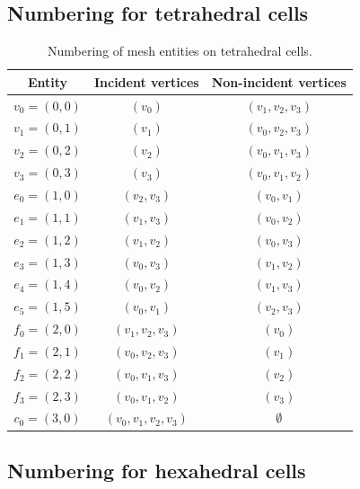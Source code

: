 \subsection{Numbering for tetrahedral cells}

\begin{table}[H]
\linespread{1.1}\selectfont
  \begin{center}
    \begin{tabular}{|c|c|c|}
      \hline
      Entity & Incident vertices & Non-incident vertices \\
      \hline
      \hline
      $v_0 = (0, 0)$ & $(v_0)$ & $(v_1, v_2, v_3)$ \\
      \hline
      $v_1 = (0, 1)$ & $(v_1)$ & $(v_0, v_2, v_3)$ \\
      \hline
      $v_2 = (0, 2)$ & $(v_2)$ & $(v_0, v_1, v_3)$ \\
      \hline
      $v_3 = (0, 3)$ & $(v_3)$ & $(v_0, v_1, v_2)$ \\
      \hline
      $e_0 = (1, 0)$ & $(v_2, v_3)$ & $(v_0, v_1)$ \\
      \hline
      $e_1 = (1, 1)$ & $(v_1, v_3)$ & $(v_0, v_2)$ \\
      \hline
      $e_2 = (1, 2)$ & $(v_1, v_2)$ & $(v_0, v_3)$ \\
      \hline
      $e_3 = (1, 3)$ & $(v_0, v_3)$ & $(v_1, v_2)$ \\
      \hline
      $e_4 = (1, 4)$ & $(v_0, v_2)$ & $(v_1, v_3)$ \\
      \hline
      $e_5 = (1, 5)$ & $(v_0, v_1)$ & $(v_2, v_3)$ \\
      \hline
      $f_0 = (2, 0)$ & $(v_1, v_2, v_3)$ & $(v_0)$ \\
      \hline
      $f_1 = (2, 1)$ & $(v_0, v_2, v_3)$ & $(v_1)$ \\
      \hline
      $f_2 = (2, 2)$ & $(v_0, v_1, v_3)$ & $(v_2)$ \\
      \hline
      $f_3 = (2, 3)$ & $(v_0, v_1, v_2)$ & $(v_3)$ \\
      \hline
      $c_0 = (3, 0)$ & $(v_0, v_1, v_2, v_3)$ & $\emptyset$ \\
      \hline
    \end{tabular}
    \caption{Numbering of mesh entities on tetrahedral cells.}
        \label{tab:tetrahedron,entities} 
  \end{center}
\end{table}

\subsection{Numbering for hexahedral cells}


